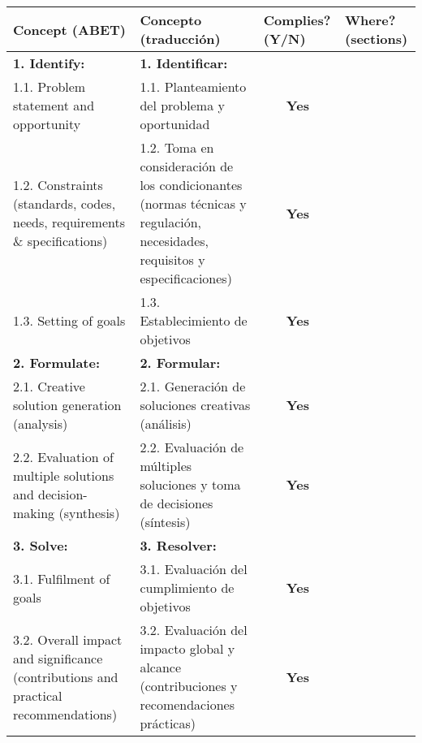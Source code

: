\vspace*{4mm}

\begingroup
\footnotesize
\renewcommand{\arraystretch}{1.5}
\begin{tabular}{|m{4.9cm}|m{4.9cm}|m{1.7cm}|m{1.7cm}|}
\hline
\textbf{Concept (ABET)} & \textbf{Concepto (traducción)} & \textbf{Complies? (Y/N)} & \textbf{Where? (sections)} \\ \hline\hline

\textbf{1. Identify:} & \textbf{1. Identificar:} & & \\ \hline
1.1. Problem statement and opportunity & 1.1. Planteamiento del problema y oportunidad 
& \multicolumn{1}{c|}{{\color[HTML]{036400} \textbf{Yes}}}
& 
\\ \hline
1.2. Constraints (standards, codes, needs, requirements \& specifications) & 1.2. Toma en consideración de los condicionantes (normas técnicas y regulación, necesidades, requisitos y especificaciones) 
& \multicolumn{1}{c|}{{\color[HTML]{036400} \textbf{Yes}}}
& 
\\ \hline
1.3. Setting of goals & 1.3. Establecimiento de objetivos 
& \multicolumn{1}{c|}{{\color[HTML]{036400} \textbf{Yes}}}
& 
\\ \hline\hline

\textbf{2. Formulate:} & \textbf{2. Formular:} & & \\ \hline
2.1. Creative solution generation (analysis) & 2.1. Generación de soluciones creativas (análisis) 
& \multicolumn{1}{c|}{{\color[HTML]{036400} \textbf{Yes}}}
& 
\\ \hline
2.2. Evaluation of multiple solutions and decision-making (synthesis) & 2.2. Evaluación de múltiples soluciones y toma de decisiones (síntesis) 
& \multicolumn{1}{c|}{{\color[HTML]{036400} \textbf{Yes}}}
& 
\\ \hline\hline

\textbf{3. Solve:} & \textbf{3. Resolver:} & & \\ \hline
3.1. Fulfilment of goals & 3.1. Evaluación del cumplimiento de objetivos 
& \multicolumn{1}{c|}{{\color[HTML]{036400} \textbf{Yes}}}
& 
\\ \hline
3.2. Overall impact and significance (contributions and practical recommendations) & 3.2. Evaluación del impacto global y alcance (contribuciones y recomendaciones prácticas) 
& \multicolumn{1}{c|}{{\color[HTML]{036400} \textbf{Yes}}}
& 
\\ \hline

\end{tabular}
\endgroup


\endgroup


